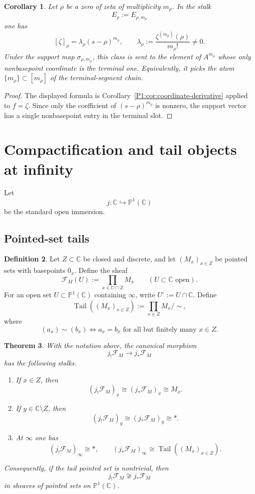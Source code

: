 \documentclass[11pt,a4paper]{article}
\numberwithin{equation}{section}
\newtheorem{theorem}{Theorem}[section]
\newtheorem{corollary}[theorem]{Corollary}
\theoremstyle{definition}
\newtheorem{definition}[theorem]{Definition}
\theoremstyle{remark}
\DeclareMathOperator{\Tail}{Tail}
\newcommand{\CC}{\mathbb C}
\newcommand{\PP}{\mathbb P}
\newcommand{\into}{\hookrightarrow}
\begin{document}
\begin{corollary}\label{P1:cor:zeta-support-slot}
Let $\rho$ be a zero of zeta of multiplicity $m_\rho$.  In the stalk
\[
E_\rho:=E_{\rho,m_\rho}
\]
one has
\[
[\zeta]_\rho=\lambda_\rho (s-\rho)^{m_\rho},
\qquad
\lambda_\rho:=\frac{\zeta^{(m_\rho)}(\rho)}{m_\rho!}\neq0.
\]
Under the support map $\sigma_{\rho,m_\rho}$, this class is sent to the element of $A^{m_\rho}$ whose only nonbasepoint coordinate is the terminal one.  Equivalently, it picks the atom $\{m_\rho\}\subset [m_\rho]$ of the terminal-segment chain.
\end{corollary}

\begin{proof}
The displayed formula is Corollary~\ref{P1:cor:coordinate-derivative} applied to $f=\zeta$.  Since only the coefficient of $(s-\rho)^{m_\rho}$ is nonzero, the support vector has a single nonbasepoint entry in the terminal slot.
\end{proof}

\section{Compactification and tail objects at infinity}

Let
\[
j:\CC\into\PP^1(\CC)
\]
be the standard open immersion.

\subsection{Pointed-set tails}

\begin{definition}
Let $Z\subset\CC$ be closed and discrete, and let $(M_x)_{x\in Z}$ be pointed sets with basepoints $0_x$.  Define the sheaf
\[
\mathcal F_M(U):=\prod_{x\in U\cap Z}M_x
\qquad (U\subset\CC\text{ open}).
\]
For an open set $U\subset\PP^1(\CC)$ containing $\infty$, write $U^\circ:=U\cap\CC$.  Define
\[
\Tail((M_x)_{x\in Z}):=\prod_{x\in Z}M_x\Big/\sim,
\]
where
\[
(a_x)\sim(b_x)\iff a_x=b_x\text{ for all but finitely many }x\in Z.
\]
\end{definition}

\begin{theorem}\label{P1:thm:stalks-at-infty}
With the notation above, the canonical morphism
\[
j_!\mathcal F_M\longrightarrow j_*\mathcal F_M
\]
has the following stalks.
\begin{enumerate}[label=(\roman*)]
\item If $x\in Z$, then
\[
(j_!\mathcal F_M)_x\cong (j_*\mathcal F_M)_x\cong M_x.
\]
\item If $y\in\CC\setminus Z$, then
\[
(j_!\mathcal F_M)_y\cong (j_*\mathcal F_M)_y\cong *.
\]
\item At $\infty$ one has
\[
(j_!\mathcal F_M)_\infty\cong *,
\qquad
(j_*\mathcal F_M)_\infty\cong \Tail((M_x)_{x\in Z}).
\]
\end{enumerate}
Consequently, if the tail pointed set is nontrivial, then
\[
j_!\mathcal F_M\not\cong j_*\mathcal F_M
\]
in sheaves of pointed sets on $\PP^1(\CC)$.
\end{theorem}
\end{document}
